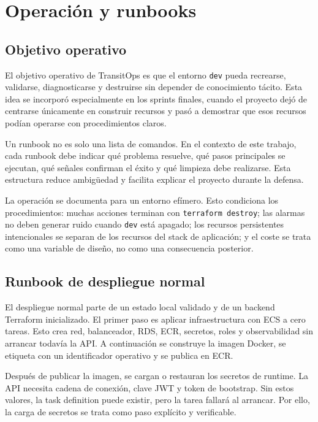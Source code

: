 \chapter{Operación y runbooks}
\label{chap:operacion-runbooks}

\section{Objetivo operativo}
\label{sec:objetivo-operativo}

El objetivo operativo de TransitOps es que el entorno \texttt{dev} pueda recrearse, validarse, diagnosticarse y destruirse sin depender de conocimiento tácito. Esta idea se incorporó especialmente en los sprints finales, cuando el proyecto dejó de centrarse únicamente en construir recursos y pasó a demostrar que esos recursos podían operarse con procedimientos claros.

Un runbook no es solo una lista de comandos. En el contexto de este trabajo, cada runbook debe indicar qué problema resuelve, qué pasos principales se ejecutan, qué señales confirman el éxito y qué limpieza debe realizarse. Esta estructura reduce ambigüedad y facilita explicar el proyecto durante la defensa.

La operación se documenta para un entorno efímero. Esto condiciona los procedimientos: muchas acciones terminan con \texttt{terraform destroy}; las alarmas no deben generar ruido cuando \texttt{dev} está apagado; los recursos persistentes intencionales se separan de los recursos del stack de aplicación; y el coste se trata como una variable de diseño, no como una consecuencia posterior.

\section{Runbook de despliegue normal}
\label{sec:runbook-deploy-normal}

El despliegue normal parte de un estado local validado y de un backend Terraform inicializado. El primer paso es aplicar infraestructura con ECS a cero tareas. Esto crea red, balanceador, RDS, ECR, secretos, roles y observabilidad sin arrancar todavía la API. A continuación se construye la imagen Docker, se etiqueta con un identificador operativo y se publica en ECR.

Después de publicar la imagen, se cargan o restauran los secretos de runtime. La API necesita cadena de conexión, clave JWT y token de bootstrap. Sin estos valores, la task definition puede existir, pero la tarea fallará al arrancar. Por ello, la carga de secretos se trata como paso explícito y verificable.

